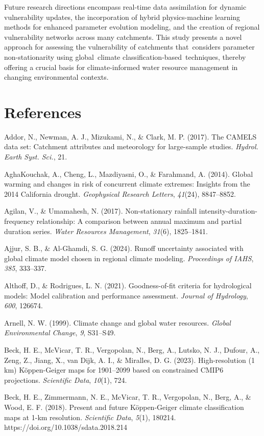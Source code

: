 \documentclass[
]{article}
\begin{document}
Future research directions encompass real-time data assimilation for
dynamic vulnerability updates, the incorporation of hybrid
physics-machine learning methods for enhanced parameter evolution
modeling, and the creation of regional vulnerability networks across
many catchments. This study presents a novel approach for assessing the
vulnerability of catchments that~considers parameter non-stationarity
using global~climate classification-based~techniques, thereby offering a
crucial basis for climate-informed water resource management in changing
environmental contexts.

\section{References}\label{references}

Addor, N., Newman, A. J., Mizukami, N., \& Clark, M. P. (2017). The
CAMELS data set: Catchment attributes and meteorology for large-sample
studies. \emph{Hydrol. Earth Syst. Sci.}, 21.

AghaKouchak, A., Cheng, L., Mazdiyasni, O., \& Farahmand, A. (2014).
Global warming and changes in risk of concurrent climate extremes:
Insights from the 2014 California drought. \emph{Geophysical Research
Letters}, \emph{41}(24), 8847--8852.

Agilan, V., \& Umamahesh, N. (2017). Non-stationary rainfall
intensity-duration-frequency relationship: A comparison between annual
maximum and partial duration series. \emph{Water Resources Management},
\emph{31}(6), 1825--1841.

Ajjur, S. B., \& Al-Ghamdi, S. G. (2024). Runoff uncertainty associated
with global climate model chosen in regional climate modeling.
\emph{Proceedings of IAHS}, \emph{385}, 333--337.

Althoff, D., \& Rodrigues, L. N. (2021). Goodness-of-fit criteria for
hydrological models: Model calibration and performance assessment.
\emph{Journal of Hydrology}, \emph{600}, 126674.

Arnell, N. W. (1999). Climate change and global water resources.
\emph{Global Environmental Change}, \emph{9}, S31--S49.

Beck, H. E., McVicar, T. R., Vergopolan, N., Berg, A., Lutsko, N. J.,
Dufour, A., Zeng, Z., Jiang, X., van Dijk, A. I., \& Miralles, D. G.
(2023). High-resolution (1 km) Köppen-Geiger maps for 1901--2099 based
on constrained CMIP6 projections. \emph{Scientific Data}, \emph{10}(1),
724.

Beck, H. E., Zimmermann, N. E., McVicar, T. R., Vergopolan, N., Berg,
A., \& Wood, E. F. (2018). Present and future Köppen-Geiger climate
classification maps at 1-km resolution. \emph{Scientific Data},
\emph{5}(1), 180214. https://doi.org/10.1038/sdata.2018.214
\end{document}
